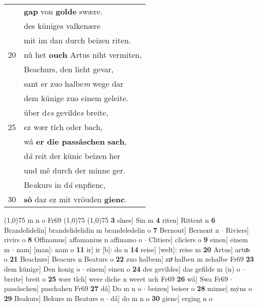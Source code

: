 \documentclass[8pt,a4paper,notitlepage]{article}
\begin{document}
\begin{table}[ht]
\begin{minipage}[t]{0.5\linewidth}
\begin{tabular}{rl}
 & \textbf{gap} von \textbf{golde} swære.\\ 
 & des küniges valkenære\\ 
 & mit im dan durch beizen riten.\\ 
20 & nû het \textbf{ouch} Artus niht vermiten,\\ 
 & Beachurs, den lieht gevar,\\ 
 & sant er zuo halbe\textit{m} wege dar\\ 
 & dem künige zuo einem geleite.\\ 
 & über d\textit{es} gevilde\textit{s} breite,\\ 
25 & ez wær tîch oder bach,\\ 
 & wâ \textbf{er die passâschen} \textbf{sach},\\ 
 & d\textit{â} reit der künic beizen her\\ 
 & und mê durch der minne ger.\\ 
 & Be\textit{a}kurs in d\textit{â} enpfienc,\\ 
30 & \textbf{sô} daz ez mit vröuden \textbf{gienc}.\\ 
\end{tabular}
\scriptsize
\line(1,0){75} \newline
m n o Fr69 \newline
\line(1,0){75} \newline
\newline
\line(1,0){75} \newline
\textbf{3} sînes] Sin m \textbf{4} riten] Rittent n \textbf{6} Brandelidelin] brandelidelidin m brandeledelin o \textbf{7} Bernout] Bernont n  $\cdot$ Riviers] rivirs o \textbf{8} Offinamus] affamanius n affinamo o  $\cdot$ Clitiers] cliciers o \textbf{9} einen] einem m  $\cdot$ nam] [man]: nam o \textbf{11} ir] ir [b]: do n \textbf{14} reise] [welt]: reise m \textbf{20} Artus] artuͯs o \textbf{21} Beachurs] Beacurs n Beaturs o \textbf{22} zuo halbem] zuͯ halben m zehalbe Fr69 \textbf{23} dem künige] Den konig o  $\cdot$ einem] einen o \textbf{24} des gevildes] das gefilde m (n) o  $\cdot$ breite] breit o \textbf{25} wær tîch] were diche n weret uch Fr69 \textbf{26} wâ] Swa Fr69  $\cdot$ passâschen] paschahen Fr69 \textbf{27} dâ] Do m n o  $\cdot$ beizen] beiser o \textbf{28} minne] mẏns o \textbf{29} Beakurs] Bekurs m Beaturs o  $\cdot$ dâ] do m n o \textbf{30} gienc] erging n o \newline
\end{minipage}
\end{table}
\newpage
\end{document}

